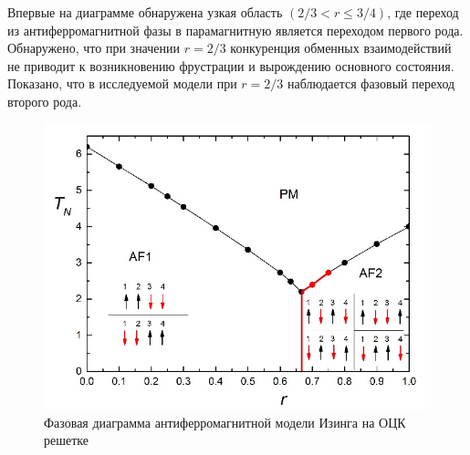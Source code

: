 Впервые на диаграмме обнаружена узкая область $(2/3 < r \leq 3/4)$, где переход из антиферромагнитной фазы в парамагнитную является переходом первого рода. Обнаружено, что при значении $r=2/3$ конкуренция обменных взаимодействий не приводит к возникновению фрустрации и вырождению основного состояния. Показано, что в исследуемой модели при $r = 2/3$ наблюдается фазовый переход второго рода.

\begin{figure}[H]
	\centering
	\includegraphics[width=0.5\linewidth]{content/sections/images/phys1-1}
	\caption{Фазовая диаграмма антиферромагнитной модели Изинга на ОЦК решетке}
     \label{phys1-pic-1}
\end{figure}




%
%
%
%
%
%



